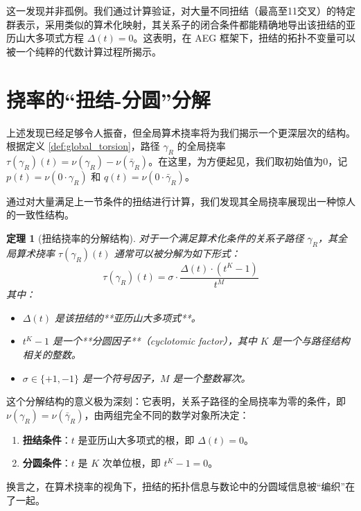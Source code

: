 \documentclass[a4paper,12pt]{book}
\numberwithin{problem}{section}
\numberwithin{definition}{section}
\numberwithin{lemma}{section}
\numberwithin{proposition}{section}
\newtheorem{theorem}{定理}
\numberwithin{theorem}{section}
\numberwithin{grammar}{section}
\numberwithin{program}{section}
\numberwithin{convention}{section}
\numberwithin{corollary}{section}
\begin{document}
这一发现并非孤例。我们通过计算验证，对大量不同扭结（最高至11交叉）的特定群表示，采用类似的算术化映射，其关系子的闭合条件都能精确地导出该扭结的亚历山大多项式方程 $\Delta(t)=0$。这表明，在 AEG 框架下，扭结的拓扑不变量可以被一个纯粹的代数计算过程所揭示。

\section{挠率的“扭结-分圆”分解}
\label{sec:knot_cyclotomic_decomposition}

上述发现已经足够令人振奋，但全局算术挠率将为我们揭示一个更深层次的结构。根据定义 \ref{def:global_torsion}，路径 $\gamma_R$ 的全局挠率 $\tau(\gamma_R)(t) = \nu(\gamma_R) - \nu(\bar{\gamma}_R)$。在这里，为方便起见，我们取初始值为0，记 $p(t) = \nu(0 \cdot \gamma_R)$ 和 $q(t) = \nu(0 \cdot \bar{\gamma}_R)$。

通过对大量满足上一节条件的扭结进行计算，我们发现其全局挠率展现出一种惊人的一致性结构。

\begin{theorem}[扭结挠率的分解结构]
    \label{thm:knot_torsion_decomposition}
    对于一个满足算术化条件的关系子路径 $\gamma_R$，其全局算术挠率 $\tau(\gamma_R)(t)$ 通常可以被分解为如下形式：
    \begin{equation}
        \tau(\gamma_R)(t) = \sigma \cdot \frac{\Delta(t) \cdot (t^K - 1)}{t^M}
        \label{eq:knot_torsion_decomposition}
    \end{equation}
    其中：
    \begin{itemize}
        \item $\Delta(t)$ 是该扭结的**亚历山大多项式**。
        \item $t^K - 1$ 是一个**分圆因子**（cyclotomic factor），其中 $K$ 是一个与路径结构相关的整数。
        \item $\sigma \in \{+1, -1\}$ 是一个符号因子，$M$ 是一个整数幂次。
    \end{itemize}
\end{theorem}

这个分解结构的意义极为深刻：它表明，关系子路径的全局挠率为零的条件，即 $\nu(\gamma_R) = \nu(\bar{\gamma}_R)$，由两组完全不同的数学对象所决定：
\begin{enumerate}
    \item \textbf{扭结条件}：$t$ 是亚历山大多项式的根，即 $\Delta(t)=0$。
    \item \textbf{分圆条件}：$t$ 是 $K$ 次单位根，即 $t^K-1=0$。
\end{enumerate}
换言之，在算术挠率的视角下，扭结的拓扑信息与数论中的分圆域信息被“编织”在了一起。
\end{document}

